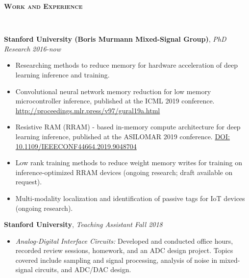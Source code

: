 \documentclass{article}
\newenvironment{changemargin}[2]{%
  \begin{list}{}{%
    \setlength{\topsep}{0pt}%
    \setlength{\leftmargin}{#1}%
    \setlength{\rightmargin}{#2}%
    \setlength{\listparindent}{\parindent}%
    \setlength{\itemindent}{\parindent}%
    \setlength{\parsep}{\parskip}%
  }%
  \item[]}{\end{list}
}
\newcommand{\lineover}{
	\begin{changemargin}{-0.05in}{-0.05in}
		\vspace*{-8pt}
		\hrulefill \\
		\vspace*{-2pt}
	\end{changemargin}
}
\newcommand{\header}[1]{
	\begin{changemargin}{-.5in}{-0.5in}
		{\large \textbf{\scshape{#1}}}\\
  	\lineover
	\end{changemargin}
}
\newenvironment{body} {
	\vspace*{-16pt}
	\begin{changemargin}{-0.25in}{-0.5in}
  }	
	{\end{changemargin}
}
\begin{document}
\smallskip


\header{Work and Experience}

\begin{body}
	\vspace{14pt}
	
	\textbf{Stanford University (Boris Murmann Mixed-Signal Group)}, \emph{PhD Research} \hfill \emph{2016-now}\\
	\vspace*{-4pt}
	\begin{itemize}
	    \item Researching methods to reduce memory for hardware acceleration of deep learning inference and training.
	    \item Convolutional neural network memory reduction for low memory microcontroller inference, published at the ICML 2019 conference. \url{http://proceedings.mlr.press/v97/gural19a.html}
	    \item Resistive RAM (RRAM) - based in-memory compute architecture for deep learning inference, published at the ASILOMAR 2019 conference. \url{DOI: 10.1109/IEEECONF44664.2019.9048704}
	    \item Low rank training methods to reduce weight memory writes for training on inference-optimized RRAM devices (ongoing research; draft available on request).
	    \item Multi-modality localization and identification of passive tags for IoT devices (ongoing research).
	\end{itemize}

	\smallskip

	\textbf{Stanford University}, \emph{Teaching Assistant} \hfill \emph{Fall 2018} \\
	\vspace*{-4pt}
	\begin{itemize}
		\item \emph{Analog-Digital Interface Circuits:} Developed and conducted office hours, recorded review sessions, homework, and an ADC design project. Topics covered include sampling and signal processing, analysis of noise in mixed-signal circuits, and ADC/DAC design.%
	\end{itemize}
	

\end{body}
\end{document}
